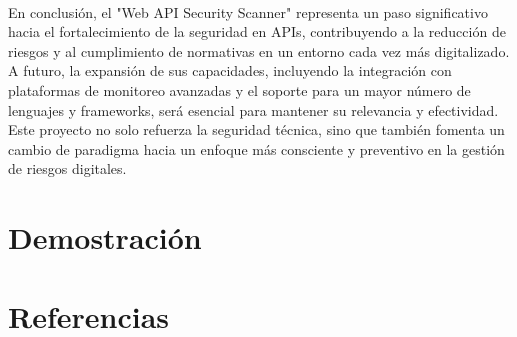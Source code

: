 \documentclass{article}
\begin{document}
    \\[2\baselineskip]
    En conclusión, el "Web API Security Scanner" representa un paso significativo hacia el fortalecimiento de la seguridad en APIs, contribuyendo a la reducción de riesgos y al cumplimiento de normativas en un entorno cada vez más digitalizado. A futuro, la expansión de sus capacidades, incluyendo la integración con plataformas de monitoreo avanzadas y el soporte para un mayor número de lenguajes y frameworks, será esencial para mantener su relevancia y efectividad. Este proyecto no solo refuerza la seguridad técnica, sino que también fomenta un cambio de paradigma hacia un enfoque más consciente y preventivo en la gestión de riesgos digitales.

    \section{Demostración}
    \section{Referencias}
\end{document}
